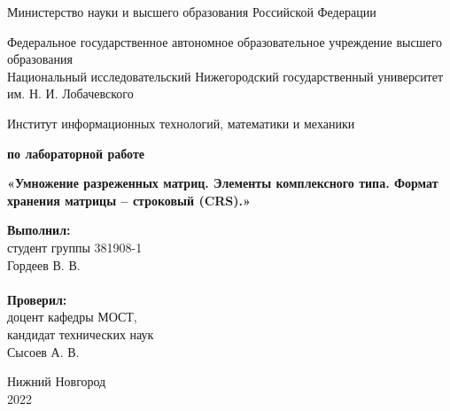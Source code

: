 \documentclass{report}
\begin{document}
\begin{titlepage}

\begin{center}
Министерство науки и высшего образования Российской Федерации
\end{center}

\begin{center}
Федеральное государственное автономное образовательное учреждение высшего образования \\
Национальный исследовательский Нижегородский государственный университет им. Н. И. Лобачевского
\end{center}

\begin{center}
Институт информационных технологий, математики и механики
\end{center}

\vspace{4em}

\begin{center}
\textbf{ по лабораторной работе} \\
\end{center}
\begin{center}
\textbf{\Large«Умножение разреженных матриц. Элементы комплексного типа. Формат хранения матрицы – строковый (CRS).»} \\
\end{center}

\vspace{4em}

\newbox{\lbox}
\newlength{\maxl}
\setlength{\maxl}{\wd\lbox}
\hfill\parbox{7cm}{
\hspace*{5cm}\hspace*{-5cm}\textbf{Выполнил:} \\ студент группы 381908-1 \\ Гордеев В. В.\\
\\
\hspace*{5cm}\hspace*{-5cm}\textbf{Проверил:}\\ доцент кафедры МОСТ, \\ кандидат технических наук \\ Сысоев А. В.\\
}
\vspace{\fill}

\begin{center} Нижний Новгород \\ 2022 \end{center}

\end{titlepage}
\end{document}
